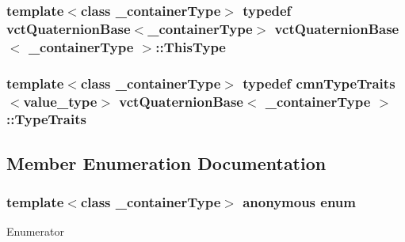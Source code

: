 \subsubsection[{This\+Type}]{\setlength{\rightskip}{0pt plus 5cm}template$<$class \+\_\+container\+Type$>$ typedef {\bf vct\+Quaternion\+Base}$<$\+\_\+container\+Type$>$ {\bf vct\+Quaternion\+Base}$<$ \+\_\+container\+Type $>$\+::{\bf This\+Type}}\label{classvct_quaternion_base_af28efdc38acf89acb7a67afada11408c}
\hypertarget{classvct_quaternion_base_a4c70fa57d856488a018b94b70d61b25c}{}
\subsubsection[{Type\+Traits}]{\setlength{\rightskip}{0pt plus 5cm}template$<$class \+\_\+container\+Type$>$ typedef {\bf cmn\+Type\+Traits}$<$value\+\_\+type$>$ {\bf vct\+Quaternion\+Base}$<$ \+\_\+container\+Type $>$\+::{\bf Type\+Traits}}\label{classvct_quaternion_base_a4c70fa57d856488a018b94b70d61b25c}


\subsection{Member Enumeration Documentation}
\hypertarget{classvct_quaternion_base_a4cebcfc5f0fce9b5ead4e1e01fa8d868}{}\subsubsection[{anonymous enum}]{\setlength{\rightskip}{0pt plus 5cm}template$<$class \+\_\+container\+Type$>$ anonymous enum}\label{classvct_quaternion_base_a4cebcfc5f0fce9b5ead4e1e01fa8d868}
\begin{Desc}
\item[Enumerator]\par
\begin{description}
\item[{\em 
\hypertarget{classvct_quaternion_base_a4cebcfc5f0fce9b5ead4e1e01fa8d868afd9c7f6b98e709b1a5c12c86e6a7ee8f}{}S\+I\+Z\+E\label{classvct_quaternion_base_a4cebcfc5f0fce9b5ead4e1e01fa8d868afd9c7f6b98e709b1a5c12c86e6a7ee8f}
}]\end{description}
\end{Desc}


